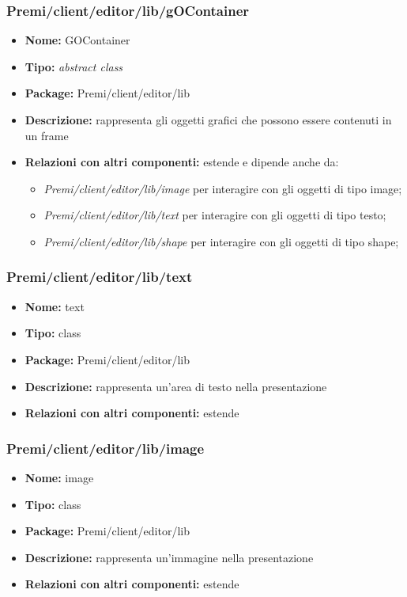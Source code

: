 \subsubsection{Premi/client/editor/lib/gOContainer}
\begin{itemize}
  \item[] \textbf{Nome:} GOContainer
  \item[] \textbf{Tipo:} \textit{abstract class}
  \item[] \textbf{Package:} Premi/client/editor/lib
  \item[] \textbf{Descrizione:} rappresenta gli oggetti grafici che possono essere contenuti in un frame 
  \item[] \textbf{Relazioni con altri componenti:} estende  e dipende anche da:
  \begin{itemize} 
	\item \textit{Premi/client/editor/lib/image} per interagire con gli oggetti di tipo image;
	\item \textit{Premi/client/editor/lib/text} per interagire con gli oggetti di tipo testo;
	\item \textit{Premi/client/editor/lib/shape} per interagire con gli oggetti di tipo shape;
\end{itemize}  
\end{itemize}
\subsubsection{Premi/client/editor/lib/text}
\begin{itemize}
  \item[] \textbf{Nome:} text
  \item[] \textbf{Tipo:} class
  \item[] \textbf{Package:} Premi/client/editor/lib
  \item[] \textbf{Descrizione:} rappresenta un'area di testo nella presentazione
  \item[] \textbf{Relazioni con altri componenti:} estende 
\end{itemize}
\subsubsection{Premi/client/editor/lib/image}
\begin{itemize}
  \item[] \textbf{Nome:} image
  \item[] \textbf{Tipo:} class
  \item[] \textbf{Package:} Premi/client/editor/lib
  \item[] \textbf{Descrizione:} rappresenta un'immagine nella presentazione
  \item[] \textbf{Relazioni con altri componenti:} estende 
\end{itemize}
